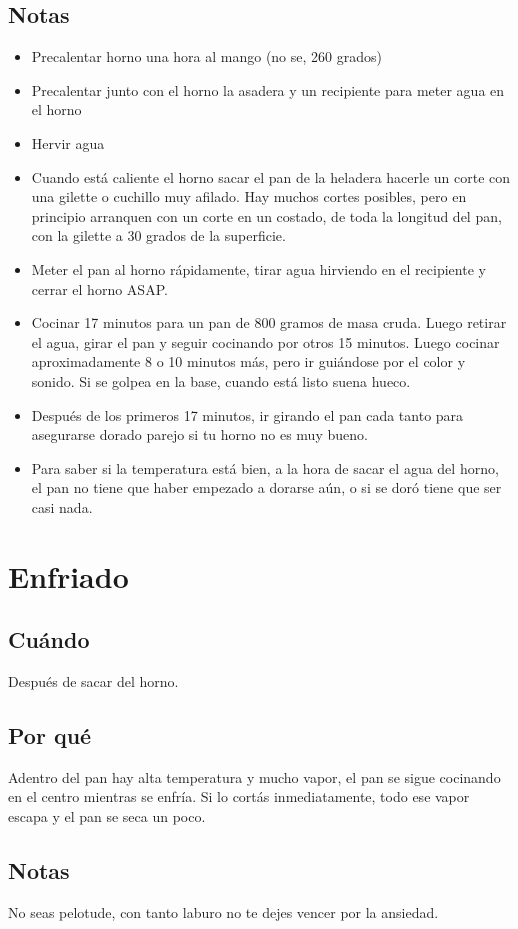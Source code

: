 \documentclass[10pt,a4paper]{article}
\begin{document}
\subsection*{Notas}
\begin{itemize}
\item Precalentar horno una hora al mango (no se, 260 grados)
\item Precalentar junto con el horno la asadera y un recipiente para meter
  agua en el horno
\item Hervir agua
\item Cuando está caliente el horno sacar el pan de la heladera hacerle un
  corte con una gilette o cuchillo muy afilado. Hay muchos cortes posibles,
  pero en principio arranquen con un corte en un costado, de toda la
  longitud del pan, con la gilette a 30 grados de la superficie.

\item Meter el pan al horno rápidamente, tirar agua hirviendo en el
  recipiente y cerrar el horno ASAP.
\item Cocinar 17 minutos para un pan de 800 gramos de masa cruda. Luego
  retirar el agua, girar el pan y seguir cocinando por otros 15 minutos.
  Luego cocinar aproximadamente 8 o 10 minutos más, pero ir guiándose por el
  color y sonido. Si se golpea en la base, cuando está listo suena hueco.
\item Después de los primeros 17 minutos, ir girando el pan cada tanto para
  asegurarse dorado parejo si tu horno no es muy bueno.
\item Para saber si la temperatura está bien, a la hora de sacar el agua del
  horno, el pan no tiene que haber empezado a dorarse aún, o si se doró tiene
  que ser casi nada.

\end{itemize}

\section{Enfriado}
\subsection*{Cuándo}
Después de sacar del horno.
\subsection*{Por qué}
Adentro del pan hay alta temperatura y mucho vapor, el pan se sigue cocinando en
el centro mientras se enfría. Si lo cortás inmediatamente, todo ese vapor escapa
y el pan se seca un poco.
\subsection*{Notas}
No seas pelotude, con tanto laburo no te dejes vencer por la ansiedad.
\end{document}
